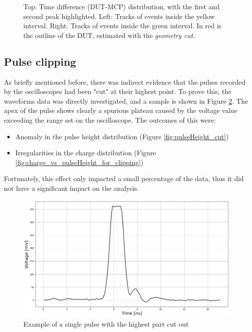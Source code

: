 \begin{figure}[h!tbp]
    \captionsetup{width=\captionwidth}
    \caption{Top: Time difference (DUT-MCP) distribution, with the first and second peak highlighted.
    Left: Tracks of events inside the yellow interval. Right: Tracks of events inside the green interval. In red is the outline of the DUT, estimated with the \textit{geometry cut}.}
    \label{fig:time_difference_multiple_peaks_highlight}
\end{figure}

\FloatBarrier

\subsection{Pulse clipping}\label{sec:pulse_clipping}

As briefly mentioned before, there was indirect evidence that the pulses recorded by the oscilloscopes had been "cut" at their highest point. To prove this, the waveforms data was directly investigated, and a sample is shown in Figure \ref{fig:clipped_pulse}. The apex of the pulse shows clearly a spurious plateau caused by the voltage value exceeding the range set on the oscilloscope. The outcomes of this were:

\begin{itemize}
    \item Anomaly in the pulse height distribution (Figure \ref{fig:pulseHeight_cut})
    \item Irregularities in the charge distribution (Figure \ref{fig:charge_vs_pulseHeight_for_clipping})
\end{itemize}

Fortunately, this effect only impacted a small percentage of the data, thus it did not have a significant impact on the analysis.

\begin{figure}[h!tbp]
    \centering
    \includegraphics[width=.9\linewidth]{Images/detailed_analysis/Waveform of clipped pulse (ns).png}
    \captionsetup{width=\captionwidth}
    \caption{Example of a single pulse with the highest part cut out}
    \label{fig:clipped_pulse}
\end{figure}
 

